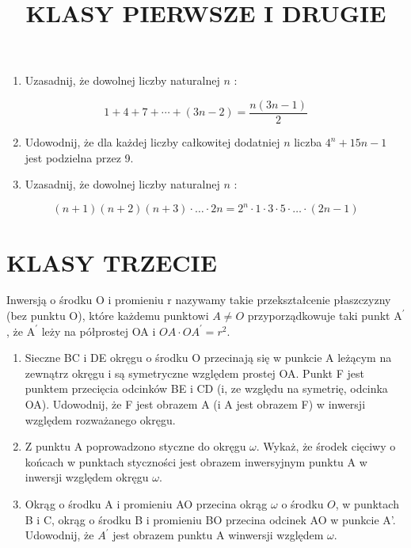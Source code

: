 \documentclass[10pt]{article}
\title{KLASY PIERWSZE I DRUGIE }
\author{}
\date{}
\begin{document}
\maketitle
\begin{enumerate}
  \item Uzasadnij, że dowolnej liczby naturalnej \(n\) :
\end{enumerate}

\[
1+4+7+\cdots+(3 n-2)=\frac{n(3 n-1)}{2}
\]

\begin{enumerate}
  \setcounter{enumi}{1}
  \item Udowodnij, że dla każdej liczby całkowitej dodatniej \(n\) liczba \(4^{n}+15 n-1\) jest podzielna przez 9.
  \item Uzasadnij, że dowolnej liczby naturalnej \(n\) :
\end{enumerate}

\[
(n+1)(n+2)(n+3) \cdot \ldots \cdot 2 n=2^{n} \cdot 1 \cdot 3 \cdot 5 \cdot \ldots \cdot(2 n-1)
\]

\section*{KLASY TRZECIE}
Inwersją o środku O i promieniu r nazywamy takie przekształcenie płaszczyzny (bez punktu O), które każdemu punktowi \(A \neq O\) przyporządkowuje taki punkt \(\mathrm{A}^{\prime}\), że \(\mathrm{A}^{\prime}\) leży na półprostej OA i \(O A \cdot O A^{\prime}=r^{2}\).

\begin{enumerate}
  \item Sieczne BC i DE okręgu o środku O przecinają się w punkcie A leżącym na zewnątrz okręgu i są symetryczne względem prostej OA. Punkt F jest punktem przecięcia odcinków BE i CD (i, ze względu na symetrię, odcinka OA). Udowodnij, że F jest obrazem A (i A jest obrazem F) w inwersji względem rozważanego okręgu.
  \item Z punktu A poprowadzono styczne do okręgu \(\omega\). Wykaż, że środek cięciwy o końcach w punktach styczności jest obrazem inwersyjnym punktu A w inwersji względem okręgu \(\omega\).
  \item Okrąg o środku A i promieniu AO przecina okrąg \(\omega\) o środku \(O\), w punktach B i C, okrąg o środku B i promieniu BO przecina odcinek AO w punkcie A'. Udowodnij, że \(A^{\prime}\) jest obrazem punktu A winwersji względem \(\omega\).
\end{enumerate}
\end{document}
